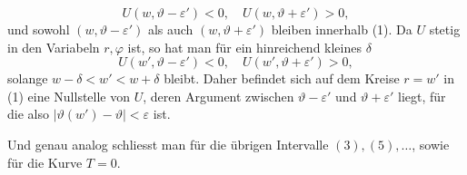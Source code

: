 \[
U(w,\vartheta-\varepsilon')<0,\quad U(w,\vartheta+\varepsilon')>0,
\]
und sowohl \((w,\vartheta-\varepsilon')\) als auch \((w,\vartheta+\varepsilon')\) bleiben innerhalb (1). Da \(U\) stetig
in den Variabeln \(r,\varphi\) ist, so hat man für ein hinreichend kleines \(\delta\)
\[
U(w',\vartheta-\varepsilon')<0,\quad U(w',\vartheta+\varepsilon')>0,
\]
solange \(w-\delta<w'<w+\delta\) bleibt. Daher befindet sich auf dem Kreise \(r=w'\)
in (1) eine Nullstelle von \(U\), deren Argument zwischen \(\vartheta-\varepsilon'\) und \(\vartheta+\varepsilon'\) liegt,
für die also \(|\vartheta(w')-\vartheta|<\varepsilon\) ist.
\par
Und genau analog schliesst man für die übrigen Intervalle \((3),(5),\ldots\),
sowie für die Kurve \(T=0\).
\par
